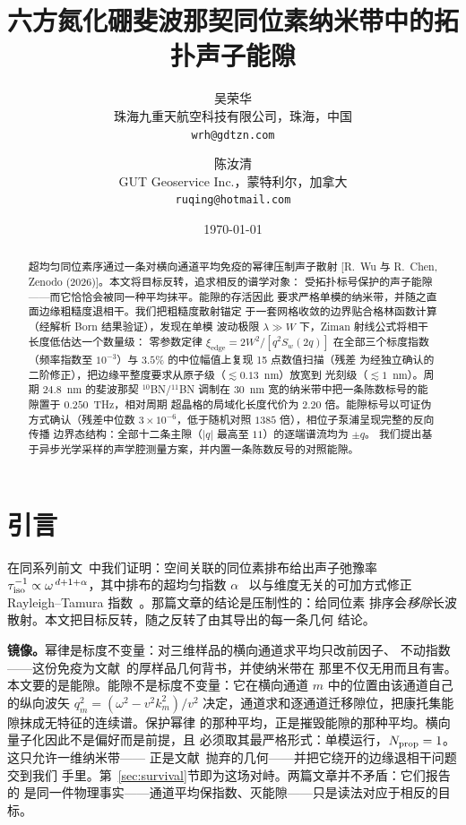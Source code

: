 \documentclass[11pt]{article}
\begin{document}
\title{六方氮化硼斐波那契同位素纳米带中的拓扑声子能隙}
\author{吴荣华\\[-1pt]\small 珠海九重天航空科技有限公司，珠海，中国\\[-2pt]\small\texttt{wrh@gdtzn.com}
\and 陈汝清\\[-1pt]\small GUT Geoservice Inc.，蒙特利尔，加拿大\\[-2pt]\small\texttt{ruqing@hotmail.com}}
\date{\today}
\maketitle

\begin{abstract}
超均匀同位素序通过一条对横向通道平均免疫的幂律压制声子散射
[R.~Wu 与 R.~Chen, Zenodo (2026)]。本文将目标反转，追求相反的谱学对象：
受拓扑标号保护的声子能隙——而它恰恰会被同一种平均抹平。能隙的存活因此
要求严格单模的纳米带，并随之直面边缘粗糙度退相干。我们把粗糙度散射锚定
于一套网格收敛的边界贴合格林函数计算（经解析 Born 结果验证），发现在单模
波动极限 $\lambda \gg W$ 下，Ziman 射线公式将相干长度低估达一个数量级：
零参数定律 $\xi_{\mathrm{edge}} = 2W^2/[q^2 S_w(2q)]$ 在全部三个标度指数
（频率指数至 $10^{-3}$）与 $3.5\%$ 的中位幅值上复现 15 点数值扫描（残差
为经独立确认的二阶修正），把边缘平整度要求从原子级（$\lesssim 0.13$~nm）放宽到
光刻级（$\lesssim 1$~nm）。周期 $24.8$~nm 的斐波那契 $^{10}$BN/$^{11}$BN
调制在 $30$~nm 宽的纳米带中把一条陈数标号的能隙置于 $0.250$~THz，相对周期
超晶格的局域化长度代价为 $2.20$ 倍。能隙标号以可证伪方式确认（残差中位数
$3\times10^{-6}$，低于随机对照 $1385$ 倍），相位子泵浦呈现完整的反向传播
边界态结构：全部十二条主隙（$|q|$ 最高至 $11$）的逐端谱流均为 $\pm q$。
我们提出基于异步光学采样的声学腔测量方案，并内置一条陈数反号的对照能隙。
\end{abstract}

\section{引言}

在同系列前文~\cite{paper1}中我们证明：空间关联的同位素排布给出声子弛豫率
$\tau^{-1}_{\rm iso} \propto \omega^{\,d+1+\alpha}$，其中排布的超均匀指数
$\alpha$~\cite{torquato2003} 以与维度无关的可加方式修正
Rayleigh--Tamura 指数~\cite{tamura1983}。那篇文章的结论是压制性的：给同位素
排序会\emph{移除}长波散射。本文把目标反转，随之反转了由其导出的每一条几何
结论。

\textbf{镜像。}幂律是标度不变量：对三维样品的横向通道求平均只改前因子、
不动指数——这份免疫为文献~\cite{paper1}的厚样品几何背书，并使纳米带在
那里不仅无用而且有害。本文要的是能隙。能隙不是标度不变量：它在横向通道
$m$ 中的位置由该通道自己的纵向波矢 $q_m^2 = (\omega^2 - v^2 k_m^2)/v^2$
决定，通道求和逐通道迁移隙位，把康托集能隙抹成无特征的连续谱。保护幂律
的那种平均，正是摧毁能隙的那种平均。横向量子化因此不是偏好而是前提，且
必须取其最严格形式：单模运行，$N_{\rm prop} = 1$。这只允许一维纳米带——
正是文献~\cite{paper1}抛弃的几何——并把它绕开的边缘退相干问题交到我们
手里。第~\ref{sec:survival}节即为这场对峙。两篇文章并不矛盾：它们报告的
是同一件物理事实——通道平均保指数、灭能隙——只是读法对应于相反的目标。
\end{document}
